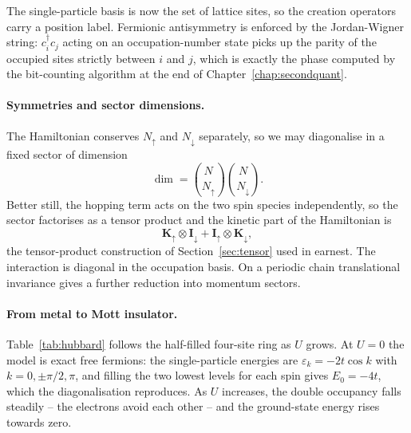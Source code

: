 The single-particle basis is now the set of lattice sites, so the creation
operators carry a position label.  Fermionic antisymmetry is enforced by the
Jordan-Wigner string: $c^{\dagger}_i c_j$ acting on an occupation-number state
picks up the parity of the occupied sites strictly between $i$ and $j$, which
is exactly the phase computed by the bit-counting algorithm at the end of
Chapter~\ref{chap:secondquant}.

\paragraph{Symmetries and sector dimensions.}
The Hamiltonian conserves $N_{\uparrow}$ and $N_{\downarrow}$ separately, so
we may diagonalise in a fixed sector of dimension
\begin{equation}
  \dim = \binom{N}{N_{\uparrow}}\binom{N}{N_{\downarrow}} .
  \label{eq:4-hubbarddim}
\end{equation}
Better still, the hopping term acts on the two spin species independently, so
the sector factorises as a tensor product and the kinetic part of the
Hamiltonian is
\begin{equation}
  \bm{K}_{\uparrow}\otimes\bm{I}_{\downarrow}
  + \bm{I}_{\uparrow}\otimes\bm{K}_{\downarrow},
  \label{eq:4-hubbardkron}
\end{equation}
the tensor-product construction of Section~\ref{sec:tensor} used in earnest.
The interaction is diagonal in the occupation basis.  On a periodic chain
translational invariance gives a further reduction into momentum sectors.

\paragraph{From metal to Mott insulator.}
Table~\ref{tab:hubbard} follows the half-filled four-site ring as $U$ grows.
At $U=0$ the model is exact free fermions: the single-particle energies are
$\varepsilon_k=-2t\cos k$ with $k=0,\pm\pi/2,\pi$, and filling the two lowest
levels for each spin gives $E_0=-4t$, which the diagonalisation reproduces.
As $U$ increases, the double occupancy falls steadily -- the electrons avoid
each other -- and the ground-state energy rises towards zero.

